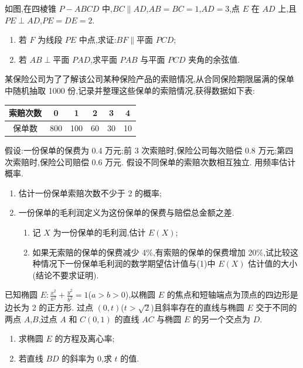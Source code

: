 \begin{problem}
如图,在四棱锥 \(P-ABCD\) 中,\(BC\parallel AD\),\(AB=BC=1\),\(AD=3\),点 \(E\) 在 \(AD\) 上,且 \(PE\perp AD\),\(PE=DE=2\).

\begin{enumerate}
\item 若 \(F\) 为线段 \(PE\) 中点,求证:\(BF\parallel \text{平面 }PCD\);
\item 若 \(AB\perp \text{平面 }PAD\),求平面 \(PAB\) 与平面 \(PCD\) 夹角的余弦值.
\end{enumerate}

\end{problem}

\begin{problem}
某保险公司为了了解该公司某种保险产品的索赔情况,从合同保险期限届满的保单中随机抽取 1000 份,记录并整理这些保单的索赔情况,获得数据如下表:

\begin{center}
\begin{tabular}{|c|c|c|c|c|c|}
\hline
索赔次数 & 0 & 1 & 2 & 3 & 4 \\
\hline
保单数 & 800 & 100 & 60 & 30 & 10 \\
\hline
\end{tabular}
\end{center}

假设:一份保单的保费为 0.4 万元;前 3 次索赔时,保险公司每次赔偿 0.8 万元;第四次索赔时,保险公司赔偿 0.6 万元. 假设不同保单的索赔次数相互独立. 用频率估计概率.

\begin{enumerate}
\item 估计一份保单索赔次数不少于 2 的概率;
\item 一份保单的毛利润定义为这份保单的保费与赔偿总金额之差.
    \begin{enumerate}
    \item 记 \(X\) 为一份保单的毛利润,估计 \(E(X)\);
    \item 如果无索赔的保单的保费减少 4\%,有索赔的保单的保费增加 20\%,试比较这种情况下一份保单毛利润的数学期望估计值与(1)中 \(E(X)\) 估计值的大小(结论不要求证明).
    \end{enumerate}
\end{enumerate}
\end{problem}

\begin{problem}
已知椭圆 \(E:\frac{x^2}{a^2}+\frac{y^2}{b^2}=1\)(\(a>b>0\)),以椭圆 \(E\) 的焦点和短轴端点为顶点的四边形是边长为 2 的正方形. 过点 \((0,t)\)(\(t>\sqrt{2}\))且斜率存在的直线与椭圆 \(E\) 交于不同的两点 \(A\),\(B\),过点 \(A\) 和 \(C(0,1)\) 的直线 \(AC\) 与椭圆 \(E\) 的另一个交点为 \(D\).

\begin{enumerate}
\item 求椭圆 \(E\) 的方程及离心率;
\item 若直线 \(BD\) 的斜率为 0,求 \(t\) 的值.
\end{enumerate}
\end{problem}

